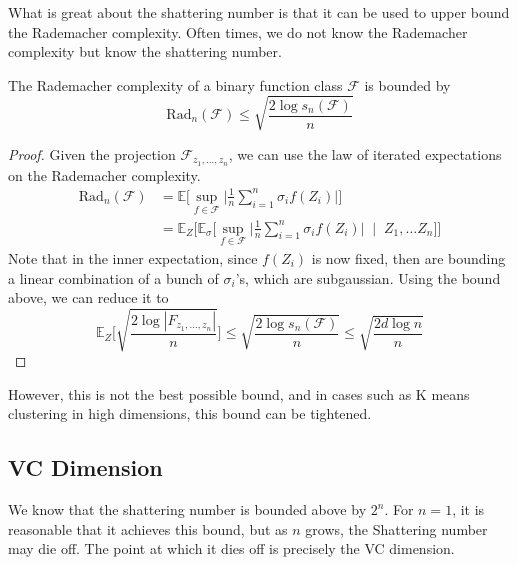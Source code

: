   What is great about the shattering number is that it can be used to upper bound the Rademacher complexity. Often times, we do not know the Rademacher complexity but know the shattering number. 

  \begin{theorem}
    The Rademacher complexity of a binary function class $\mathcal{F}$ is bounded by 
    \begin{equation}
      \mathrm{Rad}_n (\mathcal{F}) \leq \sqrt{\frac{2 \log s_n (\mathcal{F})}{n}}
    \end{equation}
  \end{theorem}
  \begin{proof}
    Given the projection $\mathcal{F}_{z_1, \ldots, z_n}$, we can use the law of iterated expectations on the Rademacher complexity. 
    \begin{align}
      \mathrm{Rad}_n (\mathcal{F}) & = \mathbb{E} \bigg[ \sup_{f \in \mathcal{F}} \bigg| \frac{1}{n} \sum_{i=1}^n \sigma_i f(Z_i) \bigg| \bigg] \\
                                   & = \mathbb{E}_{Z} \bigg[ \mathbb{E}_{\sigma} \bigg[ \sup_{f \in \mathcal{F}} \bigg| \frac{1}{n} \sum_{i=1}^n \sigma_i f(Z_i) \bigg| \; \mid \; Z_1, \ldots Z_n \bigg] \bigg] 
    \end{align}
    Note that in the inner expectation, since $f(Z_i)$ is now fixed, then are bounding a linear combination of a bunch of $\sigma_i$'s, which are subgaussian. Using the bound above, we can reduce it to 
    \begin{equation}
      \mathbb{E}_{Z} \bigg[ \sqrt{\frac{2 \log |F_{z_1, \ldots, z_n}|}{n}}\bigg] \leq \sqrt{\frac{2 \log s_n (\mathcal{F})}{n}} \leq \sqrt{\frac{2 d \log n}{n}} 
    \end{equation}
  \end{proof}

  However, this is not the best possible bound, and in cases such as K means clustering in high dimensions, this bound can be tightened. 

\subsection{VC Dimension}

  We know that the shattering number is bounded above by $2^n$. For $n = 1$, it is reasonable that it achieves this bound, but as $n$ grows, the Shattering number may die off. The point at which it dies off is precisely the VC dimension.  


